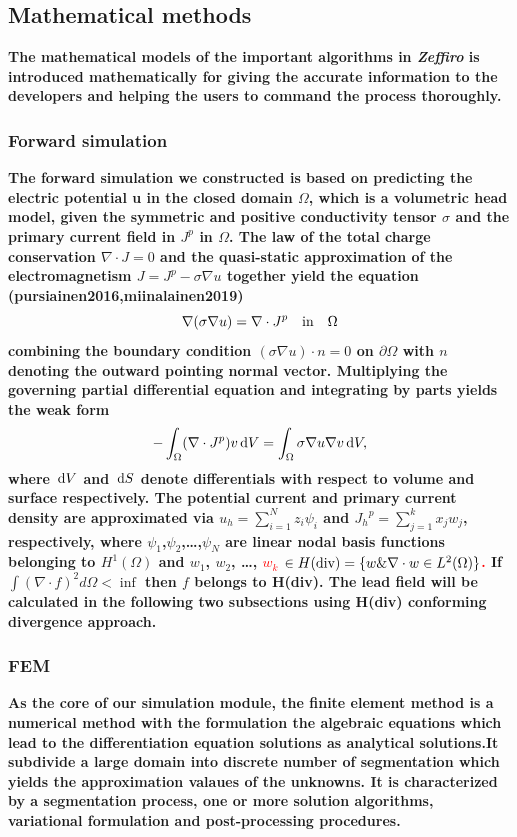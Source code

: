 \documentclass[5p]{elsarticle}
\begin{document}
\begin{frontmatter}
\subsection{Mathematical methods}
\bf The mathematical models of the important algorithms in {\em Zeffiro} is introduced mathematically for giving the accurate information to the developers and helping the users to command the process thoroughly.  


\subsubsection{Forward simulation}
\bf The forward simulation we constructed is based on  predicting the electric potential u in the closed domain $\Omega$, which is a volumetric head  model, given the symmetric and positive conductivity tensor $\sigma$ and the primary current field in ${J}^{p}$ in  $\Omega$. The law of the total charge conservation $\nabla \cdot {J}=0 $ and the quasi-static  approximation of the electromagnetism ${J}= {J}^{p} - \sigma \nabla u$ together yield the equation (pursiainen2016,miinalainen2019)
\begin{equation} 
\nabla (\sigma \nabla u) = \nabla \cdot {J}^{p} \quad \hbox{in} \quad \Omega 
\end{equation}
combining the boundary condition $(\sigma \nabla u) \cdot {n} = 0$ on 
$\partial \Omega $ with ${n}$ denoting the outward pointing normal vector. Multiplying the governing partial differential  equation and integrating by parts yields the weak form 
\begin{equation} 
-\int_{\Omega } (\nabla \cdot {J}^{p})v \, \hbox{d}V=\int_{\Omega } \sigma \nabla u \nabla v \, \hbox{d}V,
\end{equation}
where $\, \hbox{d} V$ and $\, \hbox{d}S$ denote differentials with respect to volume and surface 
respectively. The potential current and primary current density are approximated via $
u_{h} = \sum_{i=1}^{N}{z_{i}} \psi _{i}$ and ${J_{h}}^{p}= \sum_{j 
=1}^{k}{x_{j}{w_{j}}}$, respectively, where $\psi _{1}$,$ \psi 
_{2}$,\ldots ,$ \psi _{N}$ are linear nodal basis functions 
belonging to $H^{1}(\Omega )$ and ${w_{1}}$, ${w_{2}}$, \ldots ,
\textcolor{red}{{${w_{k}}$ $\in H(\hbox{div}) = \{{w}\&\nabla \cdot {w} \in L^{2}(\Omega )\}$}.}
If
$\int (\nabla\cdot f)^{2}{d}{\Omega}<\inf
$ then $f$ belongs to H(div). The lead field will be calculated in the following two subsections using H(div) conforming divergence approach.

\subsubsection{FEM}
\bf As the core of our simulation module, the finite element method is a numerical method with the formulation the algebraic equations which lead to the differentiation equation solutions as analytical solutions.It subdivide a large domain into discrete number of segmentation which yields the approximation valaues of the unknowns.\cite{14}
It is characterized by a segmentation process, one or more solution algorithms, variational formulation and post-processing procedures.


\end{frontmatter}
\end{document}
